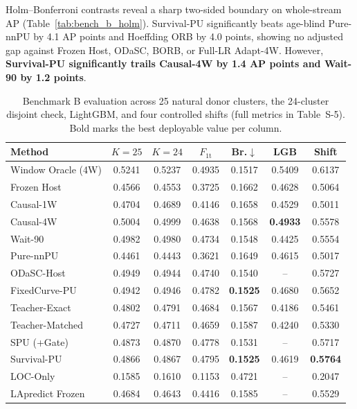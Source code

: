 \documentclass[pdflatex,sn-basic]{sn-jnl}
\theoremstyle{definition}
\theoremstyle{plain}
\begin{document}
Holm--Bonferroni contrasts reveal a sharp two-sided boundary on whole-stream AP (Table~\ref{tab:bench_b_holm}). Survival-PU significantly beats age-blind Pure-nnPU by 4.1 AP points and Hoeffding ORB by 4.0 points, showing no adjusted gap against Frozen Host, ODaSC, BORB, or Full-LR Adapt-4W. However, \textbf{Survival-PU significantly trails Causal-4W by 1.4 AP points and Wait-90 by 1.2 points}.

\begin{table}[t]
\centering
\caption{Benchmark B evaluation across 25 natural donor clusters, the 24-cluster disjoint check, LightGBM, and four controlled shifts (full metrics in Table~S-5). Bold marks the best deployable value per column.}
\label{tab:bench_b_clusters}
\fontsize{7.5}{9.0}\selectfont
\setlength{\tabcolsep}{2.0pt}
\begin{tabular*}{\textwidth}{@{\extracolsep\fill}lcccccc@{}}
\toprule
\textbf{Method} & \textbf{$K{=}25$} & \textbf{$K{=}24$} & \textbf{$F_{1\mathrm{t}}$} & \textbf{Br.$\downarrow$} & \textbf{LGB} & \textbf{Shift} \\
\midrule
Window Oracle (4W) & 0.5241 & 0.5237 & 0.4935 & 0.1517 & 0.5409 & 0.6137 \\
\midrule
Frozen Host & 0.4566 & 0.4553 & 0.3725 & 0.1662 & 0.4628 & 0.5064 \\
Causal-1W & 0.4704 & 0.4689 & 0.4146 & 0.1658 & 0.4529 & 0.5011 \\
Causal-4W & 0.5004 & 0.4999 & 0.4638 & 0.1568 & \textbf{0.4933} & 0.5578 \\
Wait-90 & 0.4982 & 0.4980 & 0.4734 & 0.1548 & 0.4425 & 0.5554 \\
Pure-nnPU & 0.4461 & 0.4443 & 0.3621 & 0.1649 & 0.4615 & 0.5017 \\
ODaSC-Host & 0.4949 & 0.4944 & 0.4740 & 0.1540 & -- & 0.5727 \\
FixedCurve-PU & 0.4942 & 0.4946 & 0.4782 & \textbf{0.1525} & 0.4680 & 0.5652 \\
Teacher-Exact & 0.4802 & 0.4791 & 0.4684 & 0.1567 & 0.4186 & 0.5461 \\
Teacher-Matched & 0.4727 & 0.4711 & 0.4659 & 0.1587 & 0.4240 & 0.5330 \\
SPU (+Gate) & 0.4873 & 0.4870 & 0.4778 & 0.1531 & -- & 0.5717 \\
Survival-PU & 0.4866 & 0.4867 & 0.4795 & \textbf{0.1525} & 0.4619 & \textbf{0.5764} \\
\midrule
LOC-Only & 0.1585 & 0.1610 & 0.1153 & 0.4721 & -- & 0.2047 \\
LApredict Frozen & 0.4684 & 0.4643 & 0.4416 & 0.1585 & -- & 0.5529 \\

\end{tabular*}
\end{table}
\end{document}
